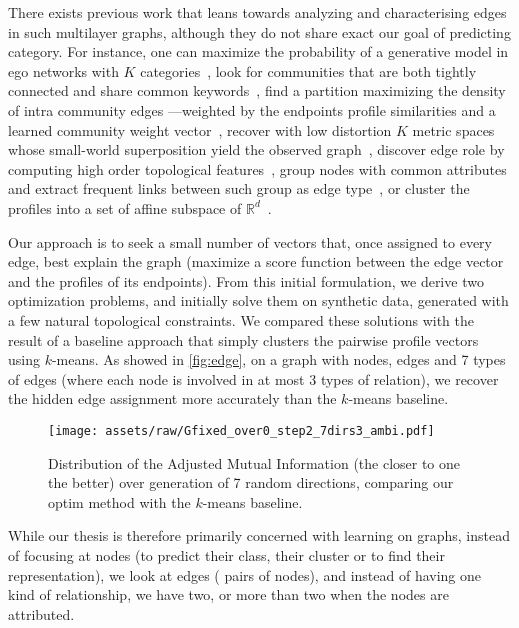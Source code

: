 There exists previous work that leans towards analyzing and characterising edges in such multilayer
graphs, although they do not share exact our goal of predicting category. For instance, one can
maximize the probability of a generative model in ego networks with $K$
categories~\autocites{LeskovecEgo12}{LeskovecEgo14}, look for communities that are both tightly
connected and share common keywords~\autocite{AttributedCommunity16}, find a partition maximizing
the density of intra community edges ---weighted by the endpoints profile similarities and a learned
community weight vector~\autocite{ZhangModelFree16}, recover with low distortion $K$ metric spaces
whose small-world superposition yield the observed graph~\autocite{Abraham2012a}, discover edge role
by computing high order topological features~\autocite{ahmed2017roles}, group nodes with common
attributes and extract frequent links between such group as edge type~\autocite{conceptualLinks12},
or cluster the profiles into a set of affine subspace of $\mathbb{R}^d$~\autocite{SCSurvey11}.

Our approach is to seek a small number of vectors that, once assigned to every edge, best explain
the graph (\ie maximize a score function between the edge vector and the profiles of its endpoints).
From this initial formulation, we derive two optimization problems, and initially solve them on
synthetic data, generated with a few natural topological constraints. We compared these solutions
with the result of a baseline approach that simply clusters the pairwise profile vectors using
$k$-means. As showed in \autoref{fig:edge}, on a graph with  nodes,  edges and 7
types of edges (where each node is involved in at most 3 types of relation), we recover the hidden
edge assignment more accurately than the $k$-means baseline.

\begin{figure}[htpb]
  \centering
  \texttt{[image: assets/raw/Gfixed\_over0\_step2\_7dirs3\_ambi.pdf]}
  \caption{Distribution of the Adjusted Mutual Information (the closer to one the better) over
   generation of 7 random directions, comparing our \textsf{optim} method with the $k$-means
baseline. \label{fig:edge}}
\end{figure}


While our thesis is therefore primarily concerned with learning on graphs, instead of focusing at
nodes (to predict their class, their cluster or to find their representation), we look at edges (\ie
pairs of nodes), and instead of having one kind of relationship, we have two, or more than two when
the nodes are attributed.
